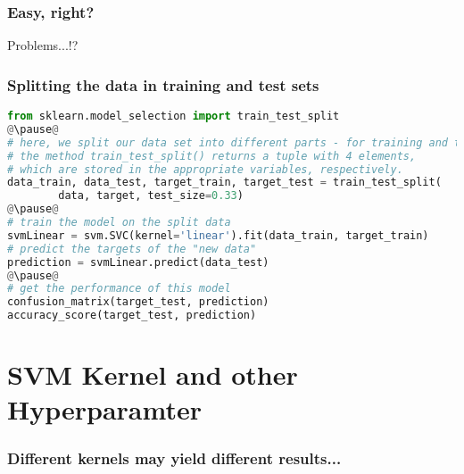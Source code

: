 \begin{frame}[c, fragile]\frametitle{Easy, right?}
  \begin{block}{Problems...!?}
  \end{block}
\end{frame}

\begin{frame}[c, fragile]\frametitle{Splitting the data in training and test sets}
  \begin{lstlisting}[language=Python]
from sklearn.model_selection import train_test_split
@\pause@
# here, we split our data set into different parts - for training and testing
# the method train_test_split() returns a tuple with 4 elements,
# which are stored in the appropriate variables, respectively.
data_train, data_test, target_train, target_test = train_test_split(
        data, target, test_size=0.33)
@\pause@
# train the model on the split data
svmLinear = svm.SVC(kernel='linear').fit(data_train, target_train)
# predict the targets of the "new data"
prediction = svmLinear.predict(data_test)
@\pause@
# get the performance of this model
confusion_matrix(target_test, prediction)
accuracy_score(target_test, prediction)
  \end{lstlisting}
\end{frame}

\section[Hyperparameter]{SVM Kernel and other Hyperparamter}
\begin{frame}[c, fragile]\frametitle{Different kernels may yield different results...}
\end{frame}

